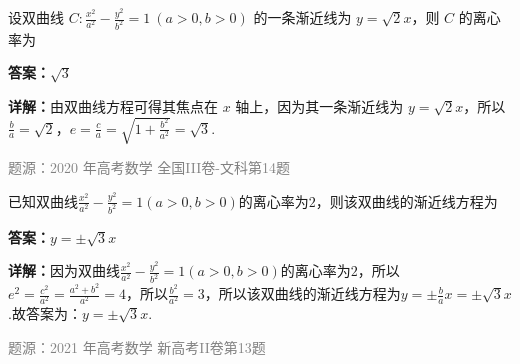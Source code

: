 \begin{question}
设双曲线 $C:\frac{x^2}{a^2}-\frac{y^2}{b^2}=1\ (a>0,b>0)$ 的一条渐近线为 $y=\sqrt{2}x$，则 $C$ 的离心率为
\begin{solution}
\textbf{答案：}$\sqrt{3}$

\textbf{详解：}由双曲线方程可得其焦点在 $x$ 轴上，因为其一条渐近线为 $y=\sqrt{2}x$，所以 $\frac{b}{a}=\sqrt{2}$，$e=\frac{c}{a}=\sqrt{1+\frac{b^2}{a^2}}=\sqrt{3}$.

\textcolor{gray}{\footnotesize 题源：2020 年高考数学 全国III卷-文科第14题}
\end{solution}
\end{question}

\begin{question}
已知双曲线$\frac{x^2}{a^2}-\frac{y^2}{b^2}=1(a>0,b>0)$的离心率为$2$，则该双曲线的渐近线方程为\underline{\hspace{3cm}}
\begin{solution}
\textbf{答案：}$y=\pm\sqrt{3}x$

\textbf{详解：}因为双曲线$\frac{x^2}{a^2}-\frac{y^2}{b^2}=1(a>0,b>0)$的离心率为$2$，所以$e^2=\frac{c^2}{a^2}=\frac{a^2+b^2}{a^2}=4$，所以$\frac{b^2}{a^2}=3$，所以该双曲线的渐近线方程为$y=\pm\frac{b}{a}x=\pm\sqrt{3}x$.故答案为：$y=\pm\sqrt{3}x$.

\textcolor{gray}{\footnotesize 题源：2021 年高考数学 新高考II卷第13题}
\end{solution}
\end{question}


